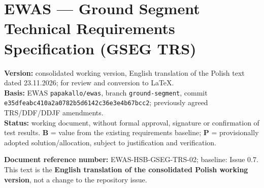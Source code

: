 \section*{EWAS — Ground Segment Technical Requirements Specification (GSEG TRS)}

\textbf{Version:} consolidated working version, English translation of the Polish text dated 23.11.2026; for review and conversion to LaTeX.\\
\textbf{Basis:} EWAS \texttt{papakallo/\allowbreak{}ewas}, branch \texttt{ground-\allowbreak{}segment}, commit \texttt{e35dfeab\allowbreak{}c410a2a0\allowbreak{}782b5d61\allowbreak{}42c36e3e\allowbreak{}4b67bcc2}; previously agreed TRS/\allowbreak{}DDF/\allowbreak{}DDJF amendments.\\
\textbf{Status:} working document, without formal approval, signature or confirmation of test results. \textbf{B} = value from the existing requirements baseline; \textbf{P} = provisionally adopted solution/\allowbreak{}allocation, subject to justification and verification.

\textbf{Document reference number:} EWAS-HSB-GSEG-TRS-02; baseline: Issue 0.7. This text is the \textbf{English translation of the consolidated Polish working version}, not a change to the repository issue.
